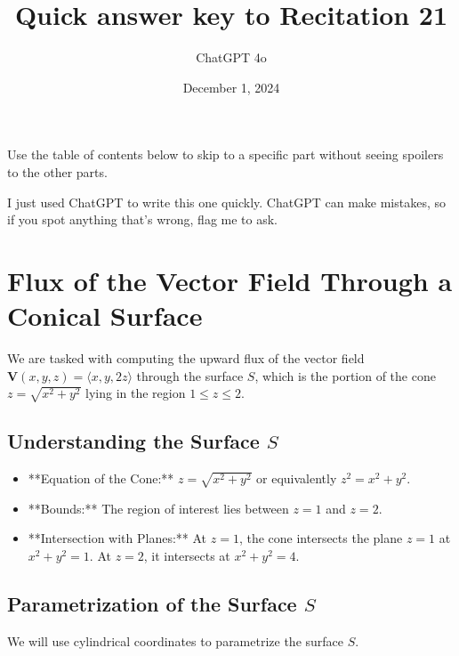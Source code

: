 \documentclass[11pt]{article}
\begin{document}
\title{Quick answer key to Recitation 21}
\author{ChatGPT 4o}
\date{December 1, 2024}
\maketitle

Use the table of contents below to skip to a specific part
without seeing spoilers to the other parts.

I just used ChatGPT to write this one quickly.
ChatGPT can make mistakes, so if you spot anything that's wrong, flag me to ask.

\tableofcontents



\newpage

\section{Flux of the Vector Field Through a Conical Surface}

We are tasked with computing the upward flux of the vector field \( \mathbf{V}(x, y, z) = \langle x, y, 2z \rangle \) through the surface \( S \), which is the portion of the cone \( z = \sqrt{x^2 + y^2} \) lying in the region \( 1 \leq z \leq 2 \).

\newpage

\subsection{Understanding the Surface \( S \)}

\begin{itemize}
    \item **Equation of the Cone:** \( z = \sqrt{x^2 + y^2} \) or equivalently \( z^2 = x^2 + y^2 \).
    \item **Bounds:** The region of interest lies between \( z = 1 \) and \( z = 2 \).
    \item **Intersection with Planes:** At \( z = 1 \), the cone intersects the plane \( z = 1 \) at \( x^2 + y^2 = 1 \). At \( z = 2 \), it intersects at \( x^2 + y^2 = 4 \).
\end{itemize}

\newpage

\subsection{Parametrization of the Surface \( S \)}

We will use cylindrical coordinates to parametrize the surface \( S \).
\end{document}
